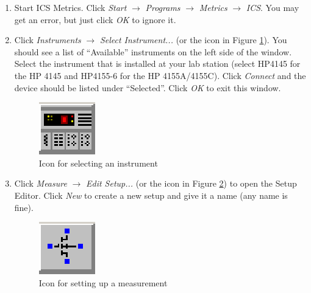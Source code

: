 \documentclass{article}
\begin{document}
\begin{enumerate}
  \item Start ICS Metrics. Click \textit{Start} $\rightarrow$ \textit{Programs} $\rightarrow$ \textit{Metrics} $\rightarrow$ \textit{ICS}. You may get an error, but just click \textit{OK} to ignore it.

  \item Click \textit{Instruments} $\rightarrow$ \textit{Select Instrument...} (or the icon in Figure \ref{instrument}). You should see a list of ``Available'' instruments on the left side of the window. Select the instrument that is installed at your lab station (select HP4145 for the HP 4145 and HP4155-6 for the HP 4155A/4155C). Click \textit{Connect} and the device should be listed under ``Selected''. Click \textit{OK} to exit this window.

\begin{figure}[!htb]
  \centering
  \includegraphics{instrument.eps}
  \caption{Icon for selecting an instrument}
  \label{instrument}
\end{figure}

  \item Click \textit{Measure} $\rightarrow$ \textit{Edit Setup...} (or the icon in Figure \ref{setup}) to open the Setup Editor. Click \textit{New} to create a new setup and give it a name (any name is fine).

\begin{figure}[!htb]
  \centering
  \includegraphics{setup.eps}
  \caption{Icon for setting up a measurement}
  \label{setup}
\end{figure}


\end{enumerate}
\end{document}
